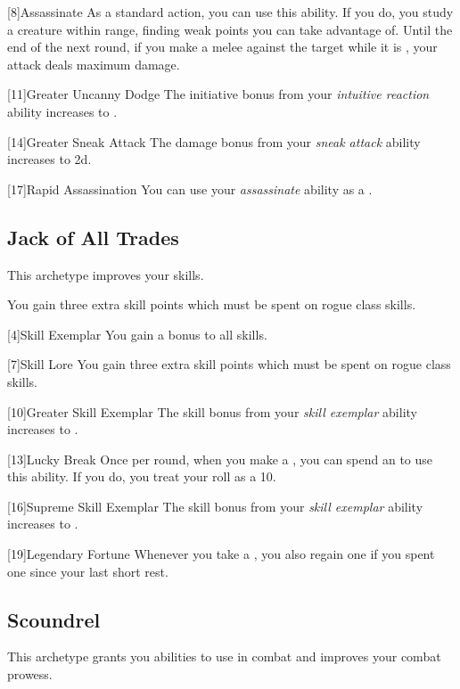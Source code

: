         [8]{Assassinate} As a standard action, you can use this ability.
        If you do, you study a creature within \rngmed range, finding weak points you can take advantage of.
        Until the end of the next round, if you make a melee  against the target while it is \unaware, your attack deals maximum damage.

        [11]{Greater Uncanny Dodge}
        The initiative bonus from your \textit{intuitive reaction} ability increases to .

        [14]{Greater Sneak Attack}
        The damage bonus from your \textit{sneak attack} ability increases to \plus2d.

        [17]{Rapid Assassination} You can use your \textit{assassinate} ability as a .

    \subsection{Jack of All Trades}
        This archetype improves your skills.

         You gain three extra skill points which must be spent on rogue class skills.

        [4]{Skill Exemplar} You gain a  bonus to all skills.

        [7]{Skill Lore} You gain three extra skill points which must be spent on rogue class skills.

        [10]{Greater Skill Exemplar} The skill bonus from your \textit{skill exemplar} ability increases to .

        [13]{Lucky Break} Once per round, when you make a , you can spend an  to use this ability.
        If you do, you treat your roll as a 10.

        [16]{Supreme Skill Exemplar} The skill bonus from your \textit{skill exemplar} ability increases to .

        [19]{Legendary Fortune} Whenever you take a , you also regain one  if you spent one since your last short rest.

    \subsection{Scoundrel}
        This archetype grants you abilities to use in combat and improves your combat prowess.

